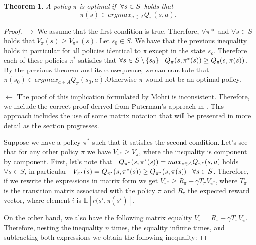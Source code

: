 \documentclass[12pt]{article}
\newtheorem{theorem}{Theorem}[section]
\numberwithin{equation}{section}
\begin{document}
\begin{theorem}
    A policy $\pi$ is optimal if  $ \hspace{1mm}\forall s \in S$ holds that
    $$ \pi(s) \in argmax_{a \in A} Q_{\pi}(s,a).$$
\end{theorem}


\begin{proof}
    $\longrightarrow$ We assume that the first condition is true. Therefore, $\forall \pi*$ and $\forall s \in S$ holds that $V_\pi(s) \geq V_{\pi*}(s)$. Let $s_0 \in S$. We have that the previous inequality holds in particular for all policies identical to $\pi$ except in the state $s_o$. Therefore each of these policies $\pi^*$ satisfies that $\forall s \in S \setminus \{s_0\} \hspace{ 3mm} Q_{\pi}(s,\pi^*(s)) \geq Q_{\pi}(s,\pi(s))$. By the previous theorem and its consequence, we can conclude that $ \pi(s_0) \in argmax_{a \in A} Q_{\pi}(s_0,a)$.Otherwise $\pi$ would not be an optimal policy.
    
   

  
   $\longleftarrow$ The proof of this implication formulated by Mohri \cite{mohri2018foundations} is inconsistent. Therefore, we include the correct proof derived from Puterman's approach in \cite{puterman2014markov}. This approach includes the use of some matrix notation that will be presented in more detail as the section progresses.


   Suppose we have a policy $\pi^*$ such that it satisfies the second condition. Let's see that for any other policy  $\pi$ we have $V_{\pi^*} \geq V_{\pi}$, where the inequality is component by component. First, let's note that $\hspace{2mm } Q_{\pi^*}(s,\pi^*(s)) =max_{a \in A} Q_{\pi^*}(s,a) $ holds $\forall s \in S $, in particular $ \hspace{ 2mm}V_{\pi^*}(s)= Q_{\pi^*}(s,\pi^*(s)) \geq Q_{\pi^*}(s ,\pi(s)) \hspace{ 3mm} \forall s \in S$. Therefore, if we rewrite the expressions in matrix form we get $V_{\pi^*} \geq R_\pi + \gamma T_\pi V_{\pi^*} $, where $T_\pi$ is the transition matrix associated with the policy $\pi$ and $R_\pi$ the expected reward vector, where element $i$ is $\mathbb{E}[r(s^i,\pi(s^i)]$.


   On the other hand, we also have the following matrix equality $V_{\pi} = R_\pi + \gamma T_\pi V_{\pi} $. Therefore, nesting the inequality $n$ times, the equality infinite times, and subtracting both expressions we obtain the following inequality:
   

\end{proof}
\end{document}
